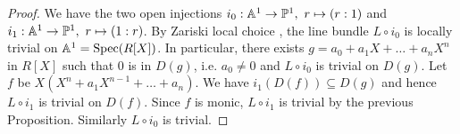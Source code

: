 \begin{proof}
  We have the two open injections $i_0:\mathbb{A}^1\rightarrow \mathbb{P}^1,~r\mapsto (r:1)$ and
  $i_1:\mathbb{A}^1\rightarrow \mathbb{P}^1,~r\mapsto (1:r)$.
  By Zariski local choice \cite{draft}, the line bundle $L\circ i_0$ is locally trivial on $\mathbb{A}^1 = \operatorname{Spec}(R[X])$.
  In particular, there exists $g = a_0 + a_1 X + \dots + a_nX^n$ in $R[X]$ such that $0$ is in $D(g)$, i.e. $a_0\neq 0$
  and $L\circ i_0$ is trivial on $D(g)$. Let $f$ be $X(X^n + a_1X^{n-1}+\dots + a_n)$. We have $i_1(D(f))\subseteq D(g)$
  and hence $L\circ i_1$ is trivial on $D(f)$. Since $f$ is monic, $L\circ i_1$ is trivial by the previous Proposition.
  Similarly $L\circ i_0$ is trivial.
\end{proof}


